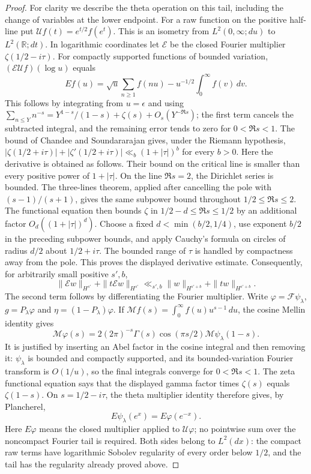 \begin{proof}
For clarity we describe the theta operation on this tail, including
the change of variables at the lower endpoint. For a raw function on
the positive half-line put
$\mathcal Uf(t)=e^{t/2}f(e^t)$. This is an isometry from
$L^2(0,\infty;du)$ to $L^2(\mathbb R;dt)$. In logarithmic coordinates
let $\mathcal E$ be the closed Fourier multiplier
$\zeta(1/2-i\tau)$. For compactly supported functions of bounded
variation, $(\mathcal E\mathcal Uf)(\log u)$ equals
\[
 Ef(u)=\sqrt u\sum_{n\ge1}f(nu)-u^{-1/2}\int_0^\infty f(v)\,dv.
\]
This follows by integrating from $u=\epsilon$ and using
$\sum_{n\le Y}n^{-s}=Y^{1-s}/(1-s)+\zeta(s)+O_s(Y^{-\Re s})$;
the first term cancels the subtracted integral, and the remaining
error tends to zero for $0<\Re s<1$.
The bound of Chandee and Soundararajan
\cite[Theorem~1.1, p.~1]{chandee-soundararajan2009} gives, under the
Riemann hypothesis,
$|\zeta(1/2+i\tau)|+|\zeta'(1/2+i\tau)|
\ll_b(1+|\tau|)^b$ for every $b>0$.
Here the derivative is obtained as follows. Their bound on the critical
line is smaller than every positive power of $1+|\tau|$. On the line
$\Re s=2$, the Dirichlet series is bounded. The three-lines theorem,
applied after cancelling the pole with $(s-1)/(s+1)$, gives the same
subpower bound throughout $1/2\le\Re s\le2$. The functional equation
then bounds $\zeta$ in $1/2-d\le\Re s\le1/2$ by an additional factor
$O_d((1+|\tau|)^d)$. Choose a fixed $d<\min(b/2,1/4)$, use exponent $b/2$
in the preceding subpower bounds, and apply Cauchy's formula on circles
of radius $d/2$ about $1/2+i\tau$. The bounded range of $\tau$ is
handled by compactness away from the pole. This proves the displayed
derivative estimate. Consequently, for arbitrarily small positive $s',b$,
\[
 \|\mathcal Ew\|_{H^{s'}}+\|t\mathcal Ew\|_{H^{s'}}
 \ll_{s',b}\|w\|_{H^{s'+b}}+\|tw\|_{H^{s'+b}}.
\]
The second term follows by differentiating the Fourier multiplier.
Write $\varphi=\mathcal F\psi_\lambda$, $g=P_\lambda\varphi$ and
$\eta=(1-P_\lambda)\varphi$. If
$\mathcal Mf(s)=\int_0^\infty f(u)u^{s-1}\,du$, the cosine Mellin
identity gives
\[
 \mathcal M\varphi(s)
 =2(2\pi)^{-s}\Gamma(s)\cos(\pi s/2)
                         \mathcal M\psi_\lambda(1-s).
\]
It is justified by inserting an Abel factor in the cosine integral
and then removing it: $\psi_\lambda$ is bounded and compactly
supported, and its bounded-variation Fourier transform is $O(1/u)$,
so the final integrals converge for $0<\Re s<1$.
The zeta functional equation says that the displayed gamma factor
times $\zeta(s)$ equals $\zeta(1-s)$. On $s=1/2-i\tau$, the theta
multiplier identity therefore gives, by Plancherel,
\[
 E\psi_\lambda(e^x)=E\varphi(e^{-x}).
\]
Here $E\varphi$ means the closed multiplier applied to
$\mathcal U\varphi$; no pointwise sum over the noncompact Fourier
tail is required. Both sides belong to $L^2(dx)$: the compact raw
terms have logarithmic Sobolev regularity of every order below
$1/2$, and the tail has the regularity already proved above.


\end{proof}
